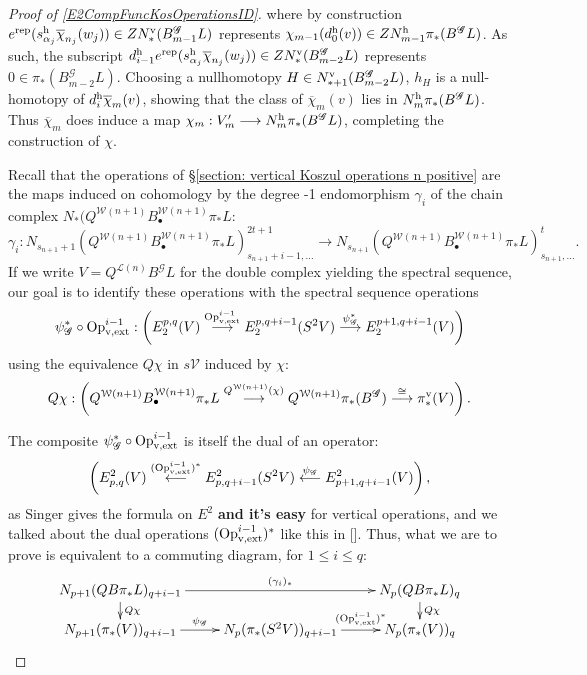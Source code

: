 \documentclass[11pt]{amsart}
\theoremstyle{plain}
\theoremstyle{definition}
\renewcommand{\to}{\longrightarrow}
\newcommand{\from}{\longleftarrow}
\newcommand{\scrG}{\mathscr{G}}
\newcommand{\calW}{\mathcal{W}}
\newcommand{\calL}{\mathcal{L}}
\newcommand{\calV}{\mathcal{V}}
\theoremstyle{plain}
\newcommand{\BSW}{{\scrG}}
\newcommand{\BSWres}{B^\BSW}%
\newcommand{\vExtCohOp}{\textup{Op}_\textup{v,ext}}
\begin{document}
\begin{Composite functor spectral sequences}
\begin{tricky proofs of operation compatibilities}
\begin{proof}[Proof of \ref{E2CompFuncKosOperationsID}]
where by construction $e^\textup{rep}(s^\textup{h}_{\alpha_j}\overline{\chi}_{n_j}(w_j))\in ZN^\textup{v}_*(\BSWres_{m-1} L)$ represents $\chi_{m-1}(d_{0}^\textup{h}(v))\in ZN_{m-1}^\textup{h}\pi_*(\BSWres  L)$. As such, the subscript $d^\textup{h}_{i-1}e^\textup{rep}(s^\textup{h}_{\alpha_j}\overline{\chi}_{n_j}(w_j))\in ZN^\textup{v}_*(\BSWres_{m-2} L)$ represents $0\in\pi_*(\BSWres_{m-2}L)$. Choosing a nullhomotopy $H\in N^\textup{v}_{*+1}(\BSWres_{m-2}L)$, $h_H$ is a null-homotopy of $d_i^\textup{h}\overline{\chi}_m(v)$, showing that the class of  $\overline{\chi}_m(v)$ lies in $N^\textup{h}_m\pi_*(\BSWres L)$.
Thus $\overline{\chi}_m$ does induce a map $\chi_m:V'_m\to N_m^\textup{h}\pi_*(\BSWres L)$, completing the construction of $\chi$.






Recall that the operations of \S\ref{section: vertical Koszul operations n positive} are the maps induced on cohomology by the degree -1 endomorphism $\gamma_i$ of the chain complex $N_*(Q^{\calW(n+1)} B^{\calW(n+1)}_{\bullet}\pi_*L$:
\[\gamma_i:N_{s_{n+1}+1}(Q^{\calW(n+1)} B^{\calW(n+1)}_{\bullet}\pi_*L)^{2t+1}_{s_{n+1}+i-1,\ldots}\to N_{s_{n+1}}(Q^{\calW(n+1)} B^{\calW(n+1)}_{\bullet}\pi_*L)^{t}_{s_{n+1},\ldots}.\]
If we write $V=Q^{\calL(n)}\BSWres L$ for the double complex yielding the spectral sequence, our goal is to identify these operations with the spectral sequence operations
\[\psi_{\BSW}^*\circ\vExtCohOp^{i-1}:\left(E^{p,q}_2(V)\overset{\vExtCohOp^{i-1}}{\to} E^{p,q+i-1}_2(S^2V)\overset{\psi_{\BSW}^*}{\to}E^{p+1,q+i-1}_2(V)\right)\]
using the equivalence $Q\chi$ in $s\calV$ induced by $\chi$:%
\[Q\chi:\left(Q^{\calW(n+1)}B^{\calW(n+1)}_{\bullet} \pi_*L\overset{Q^{\calW(n+1)}(\chi)}{\to} Q^{\calW(n+1)}\pi_*(\BSWres )\overset{\cong }{\to}\pi_*^\textup{v}(V)\right).\]

The composite $\psi_{\BSW}^*\circ\vExtCohOp^{i-1}$ is itself the dual of an operator:
\[\left(E_{p,q}^2(V)\overset{(\vExtCohOp^{i-1})^*}{\from} E_{p,q+i-1}^2(S^2V)\overset{\psi_{\BSW}}{\from}E_{p+1,q+i-1}^2(V)\right),\]
as Singer gives the formula on $E^2$ \textbf{and it's easy} for vertical operations, and we talked about the dual operations $(\vExtCohOp^{i-1})^*$ like this in []. Thus, what we are to prove is equivalent to a commuting diagram, for $1\leq i\leq q$:
\[\xymatrix@R=4mm{
N_{p+1}(QB\pi_*L)_{q+i-1}\ar[rr]^-{(\gamma_i)_*}
\ar[d]^-{Q\chi}
&%
&%
N_p(QB\pi_*L)_q\ar[d]^-{Q\chi}
\\%
N_{p+1}(\pi_*(V))_{q+i-1}\ar[r]^-{\psi_{\BSW}}
&%
N_{p}(\pi_*(S^2V))_{q+i-1}\ar[r]^-{(\vExtCohOp^{i-1})^*}
&%
N_p(\pi_*(V))_q%
}\]


\end{proof}
\end{tricky proofs of operation compatibilities}
\end{Composite functor spectral sequences}
\end{document}
